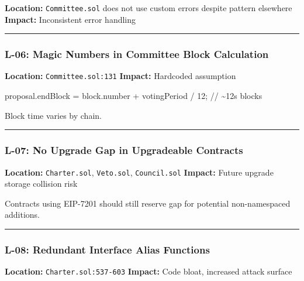 \documentclass[
]{article}
\newenvironment{Shaded}{}{}
\newcommand{\NormalTok}[1]{#1}
\begin{document}
\textbf{Location:} \texttt{Committee.sol} does not use custom errors
despite pattern elsewhere \textbf{Impact:} Inconsistent error handling

\begin{center}\rule{0.5\linewidth}{0.5pt}\end{center}

\subsubsection{L-06: Magic Numbers in Committee Block
Calculation}\label{l-06-magic-numbers-in-committee-block-calculation}

\textbf{Location:} \texttt{Committee.sol:131} \textbf{Impact:} Hardcoded
assumption

\begin{Shaded}
\begin{Highlighting}[]
\NormalTok{proposal.endBlock = block.number + votingPeriod / 12; // \textasciitilde{}12s blocks}
\end{Highlighting}
\end{Shaded}

Block time varies by chain.

\begin{center}\rule{0.5\linewidth}{0.5pt}\end{center}

\subsubsection{L-07: No Upgrade Gap in Upgradeable
Contracts}\label{l-07-no-upgrade-gap-in-upgradeable-contracts}

\textbf{Location:} \texttt{Charter.sol}, \texttt{Veto.sol},
\texttt{Council.sol} \textbf{Impact:} Future upgrade storage collision
risk

Contracts using EIP-7201 should still reserve gap for potential
non-namespaced additions.

\begin{center}\rule{0.5\linewidth}{0.5pt}\end{center}

\subsubsection{L-08: Redundant Interface Alias
Functions}\label{l-08-redundant-interface-alias-functions}

\textbf{Location:} \texttt{Charter.sol:537-603} \textbf{Impact:} Code
bloat, increased attack surface
\end{document}

